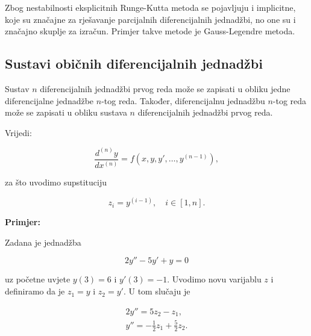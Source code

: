 Zbog nestabilnosti eksplicitnih Runge-Kutta metoda se pojavljuju i implicitne,
koje su značajne za rješavanje parcijalnih diferencijalnih jednadžbi, no one su
i značajno skuplje za izračun. Primjer takve metode je Gauss-Legendre metoda.

\subsection{Sustavi običnih diferencijalnih jednadžbi}

Sustav $n$ diferencijalnih jednadžbi prvog reda može se zapisati u obliku jedne
diferencijalne jednadžbe $n$-tog reda. Također, diferencijalnu jednadžbu $n$-tog
reda može se zapisati u obliku sustava $n$ diferencijalnih jednadžbi prvog reda.

Vrijedi:

$$
\dfrac{d^{(n)}y}{dx^{(n)}} = f(x, y, y', \dots, y^{(n-1)}),
$$

za što uvodimo supstituciju

$$
    z_i = y^{(i-1)},\quad i \in [1, n].
$$

\textbf{Primjer:}

Zadana je jednadžba

$$
2y''-5y'+y=0
$$

uz početne uvjete $y(3)=6$ i $y'(3)=-1$. Uvodimo novu varijablu $z$ i definiramo
da je $z_1=y$ i $z_2=y'$. U tom slučaju je

\begin{gather*}
    2y''=5z_2 - z_1,\\
    y''=-\frac{1}{2}z_1+\frac{5}{2}z_2.
\end{gather*}
